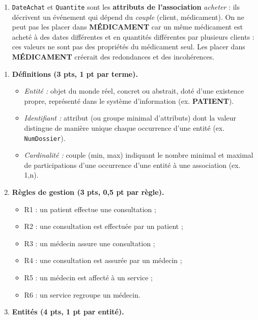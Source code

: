 \documentclass[11pt]{article}
\begin{document}
\begin{corrige}
\begin{enumerate}
\begin{itemize}
  \end{itemize}
  \item \texttt{DateAchat} et \texttt{Quantite} sont les \textbf{attributs de l'association} \emph{acheter} : ils décrivent un événement qui dépend du \emph{couple} (client, médicament). On ne peut pas les placer dans \textbf{MÉDICAMENT} car un même médicament est acheté à des dates différentes et en quantités différentes par plusieurs clients : ces valeurs ne sont pas des propriétés du médicament seul. Les placer dans \textbf{MÉDICAMENT} créerait des redondances et des incohérences.
\end{enumerate}
\end{corrige}

\begin{corrige}
\begin{enumerate}
  \item \textbf{Définitions (3 pts, 1 pt par terme).}
  \begin{itemize}
    \item \emph{Entité :} objet du monde réel, concret ou abstrait, doté d'une existence propre, représenté dans le système d'information (ex. \textbf{PATIENT}).
    \item \emph{Identifiant :} attribut (ou groupe minimal d'attributs) dont la valeur distingue de manière unique chaque occurrence d'une entité (ex. \texttt{NumDossier}).
    \item \emph{Cardinalité :} couple (min, max) indiquant le nombre minimal et maximal de participations d'une occurrence d'une entité à une association (ex. 1,n).
  \end{itemize}
  \item \textbf{Règles de gestion (3 pts, 0,5 pt par règle).}
  \begin{itemize}
    \item R1 : un patient effectue une consultation ;
    \item R2 : une consultation est effectuée par un patient ;
    \item R3 : un médecin assure une consultation ;
    \item R4 : une consultation est assurée par un médecin ;
    \item R5 : un médecin est affecté à un service ;
    \item R6 : un service regroupe un médecin.
  \end{itemize}
  \item \textbf{Entités (4 pts, 1 pt par entité).}

\end{enumerate}
\end{corrige}
\end{document}
